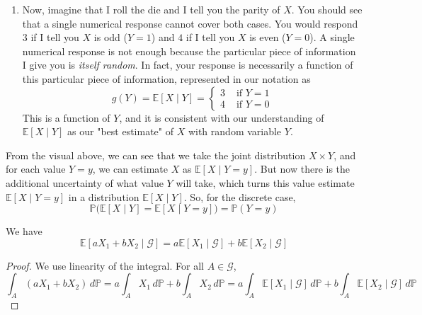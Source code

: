 \begin{example}
\begin{enumerate}
			\item Now, imagine that I roll the die and I tell you the parity of $X$. You should see that a single numerical response cannot cover both cases. You would respond $3$ if I tell you $X$ is odd ($Y = 1$) and $4$ if I tell you $X$ is even ($Y = 0$). A single numerical response is not enough because the particular piece of information I give you is \textit{itself random}. In fact, your response is necessarily a function of this particular piece of information, represented in our notation as 
			\begin{equation}
				g(Y) = \mathbb{E}[X \mid Y] = \begin{cases} 3 & \text{ if } Y = 1 \\ 4 & \text{ if } Y = 0 \end{cases}
			\end{equation}
			This is a function of $Y$, and it is consistent with our understanding of $\mathbb{E}[X \mid Y]$ as our "best estimate" of $X$ with random variable $Y$. 
		\end{enumerate}

		From the visual above, we can see that we take the joint distribution $X \times Y$, and for each value $Y = y$, we can estimate $X$ as $\mathbb{E}[X \mid Y = y]$. But now there is the additional uncertainty of what value $Y$ will take, which turns this value estimate $\mathbb{E}[X \mid Y = y]$ in a distribution $\mathbb{E}[X \mid Y]$. So, for the discrete case, 
		\begin{equation}
			\mathbb{P}\big( \mathbb{E}[X \mid Y] = \mathbb{E}[X \mid Y = y]) = \mathbb{P}(Y = y)
		\end{equation}
	\end{example}

	\begin{theorem}[Linearity]
	  \label{thm:linearity}
	  We have 
		\begin{equation}
			\mathbb{E}[a X_1 + b X_2 \mid \mathcal{G}] = a \mathbb{E}[X_1 \mid \mathcal{G}] + b \mathbb{E}[X_2 \mid \mathcal{G}]
		\end{equation}
	\end{theorem}
	\begin{proof}
	  We use linearity of the integral. For all $A \in \mathcal{G}$, 
		\begin{equation}
			\int_A (a X_1 + b X_2) \,d\mathbb{P} = a \int_A X_1 \,d\mathbb{P} + b \int_A X_2 \,d\mathbb{P} = a \int_A \mathbb{E}[X_1 \mid \mathcal{G}] \,d\mathbb{P} + b \int_A \mathbb{E}[X_2 \mid \mathcal{G}] \,d\mathbb{P}
		\end{equation}
	\end{proof}

